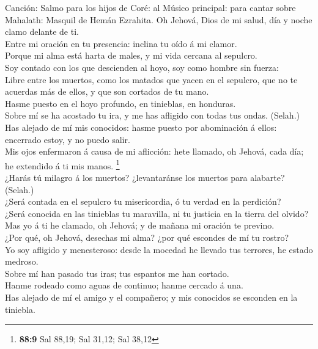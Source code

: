  Canción: Salmo para los hijos de Coré: al Músico principal:
para cantar sobre Mahalath: Masquil de Hemán Ezrahita. Oh Jehová, Dios
de mi salud, día y noche clamo delante de ti.\\
 Entre mi oración en tu presencia: inclina tu oído á mi
clamor.\\
 Porque mi alma está harta de males, y mi vida cercana al
sepulcro.\\
 Soy contado con los que descienden al hoyo, soy como hombre
sin fuerza:\\
 Libre entre los muertos, como los matados que yacen en el
sepulcro, que no te acuerdas más de ellos, y que son cortados de tu
mano.\\
 Hasme puesto en el hoyo profundo, en tinieblas, en
honduras.\\
 Sobre mí se ha acostado tu ira, y me has afligido con todas
tus ondas. (Selah.)\\
 Has alejado de mí mis conocidos: hasme puesto por
abominación á ellos: encerrado estoy, y no puedo salir.\\
 Mis ojos enfermaron á causa de mi aflicción: hete llamado,
oh Jehová, cada día; he extendido á ti mis manos. \footnote{\textbf{88:9}
  Sal 88,19; Sal 31,12; Sal 38,12}\\
 ¿Harás tú milagro á los muertos? ¿levantaránse los muertos
para alabarte? (Selah.)\\
 ¿Será contada en el sepulcro tu misericordia, ó tu verdad
en la perdición?\\
 ¿Será conocida en las tinieblas tu maravilla, ni tu
justicia en la tierra del olvido?\\
 Mas yo á ti he clamado, oh Jehová; y de mañana mi oración
te previno.\\
 ¿Por qué, oh Jehová, desechas mi alma? ¿por qué escondes
de mí tu rostro?\\
 Yo soy afligido y menesteroso: desde la mocedad he llevado
tus terrores, he estado medroso.\\
 Sobre mí han pasado tus iras; tus espantos me han
cortado.\\
 Hanme rodeado como aguas de continuo; hanme cercado á
una.\\
 Has alejado de mí el amigo y el compañero; y mis conocidos
se esconden en la tiniebla.

